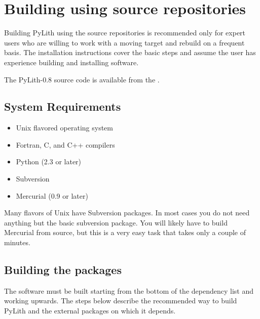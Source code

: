 \section{Building using source repositories}

\begin{warning}
  Building PyLith using the source repositories is recommended
  only for expert users who are willing to work with a moving
  target and rebuild on a frequent basis. The installation
  instructions cover the basic steps and assume the user has
  experience building and installing software.
\end{warning}

The PyLith-0.8 source code is available from the \href{http://www.geodynamics.org:8080/cig/software/Repository}
.

\subsection{System Requirements}

\begin{itemize}
\item Unix flavored operating system
\item Fortran, C, and C++ compilers
\item Python (2.3 or later)
\item Subversion
\item Mercurial (0.9 or later)
\end{itemize}

\begin{tip}
  Many flavors of Unix have Subversion packages. In most
  cases you do not need anything but the basic subversion
  package. You will likely have to build Mercurial from
  source, but this is a very easy task that takes only a
  couple of minutes.
\end{tip}

\subsection{Building the packages}

The software must be built starting from the bottom of the dependency
list and working upwards. The steps below describe the recommended way
to build PyLith and the external packages on which it depends.

